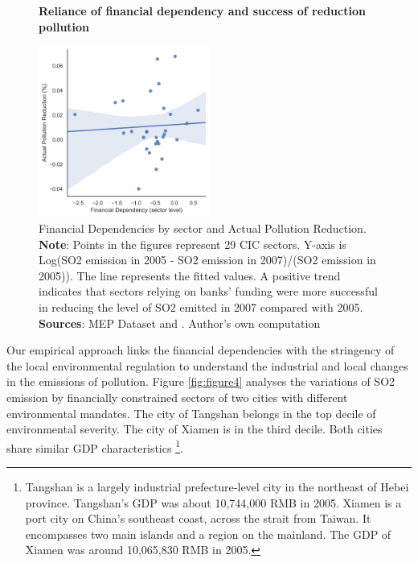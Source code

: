 \documentclass[12pt]{article}
\begin{document}
\begin{figure}[ht]
    \centering
    \textbf{Reliance of financial dependency and success of reduction pollution}\par\medskip
    \includegraphics[width=0.5\textwidth]{fig_3.jpg}
    \caption{Financial Dependencies by sector and Actual Pollution Reduction. \textbf{Note}: Points in the figures represent 29 CIC sectors. Y-axis is Log(SO2 emission in 2005 - SO2 emission in 2007)/(SO2 emission in 2005)). The line represents the fitted values. A positive trend indicates that sectors relying on banks’ funding were more successful in reducing the level of SO2 emitted in 2007 compared with 2005. \\
    \textbf{Sources}: MEP Dataset and \cite{Fan2015-bm}. Author's own computation}
    \label{fig:figure3}
\end{figure}

Our empirical approach links the financial dependencies with the stringency of the local environmental regulation to understand the industrial and local changes in the emissions of pollution. Figure \ref{fig:figure4} analyses the variations of SO2 emission by financially constrained sectors of two cities with different environmental mandates. The city of Tangshan belongs in the top decile of environmental severity. The city of Xiamen is in the third decile. Both cities share similar GDP characteristics \footnote{Tangshan is a largely industrial prefecture-level city in the northeast of Hebei province. Tangshan’s GDP was about 10,744,000 RMB in 2005. Xiamen is a port city on China’s southeast coast, across the strait from Taiwan. It encompasses two main islands and a region on the mainland. The GDP of Xiamen was around 10,065,830 RMB in 2005.}.
\end{document}
